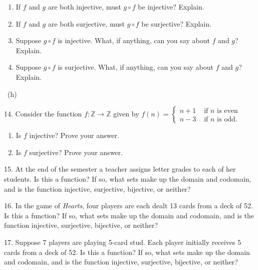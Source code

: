 \documentclass[10pt,]{book}
\theoremstyle{plain}
\theoremstyle{definition}
\theoremstyle{definition}
\theoremstyle{definition}
\numberwithin{equation}{chapter}
\def\Z{\mathbb Z}
\newcommand{\amp}{&}
\begin{document}
\begin{exerciselist}
\par
\hypertarget{p-2250}{}%
\leavevmode%
\begin{enumerate}[label=(\alph*)]
\item\hypertarget{li-464}{}\hypertarget{p-2251}{}%
If \(f\) and \(g\) are both injective, must \(g\circ f\) be injective?  Explain.%
\item\hypertarget{li-465}{}\hypertarget{p-2252}{}%
If \(f\) and \(g\) are both surjective, must \(g\circ f\) be surjective?  Explain.%
\item\hypertarget{li-466}{}\hypertarget{p-2253}{}%
Suppose \(g\circ f\) is injective.  What, if anything, can you say about \(f\) and \(g\)?  Explain.%
\item\hypertarget{li-467}{}\hypertarget{p-2254}{}%
Suppose \(g\circ f\) is surjective.  What, if anything, can you say about \(f\) and \(g\)?  Explain.%
\end{enumerate}
%
\par\smallskip
~{\tiny (h)}\item[14.]\hypertarget{exercise-95}{}\hypertarget{p-2261}{}%
Consider the function \(f:\Z \to \Z\) given by \(f(n) = \begin{cases}n+1 \amp  \text{ if }n\text{ is even} \\ n-3 \amp \text{ if }n\text{ is odd} . \end{cases}\) \leavevmode%
\begin{enumerate}[label=(\alph*)]
\item\hypertarget{li-472}{}\hypertarget{p-2262}{}%
Is \(f\) injective? Prove your answer.%
\item\hypertarget{li-473}{}\hypertarget{p-2263}{}%
Is \(f\) surjective? Prove your answer.%
\end{enumerate}
%
\par\smallskip
\item[15.]\hypertarget{exercise-96}{}\hypertarget{p-2269}{}%
At the end of the semester a teacher assigns letter grades to each of her students. Is this a function? If so, what sets make up the domain and codomain, and is the function injective, surjective, bijective, or neither?%
\par\smallskip
\item[16.]\hypertarget{exercise-97}{}\hypertarget{p-2271}{}%
In the game of \emph{Hearts}, four players are each dealt 13 cards from a deck of 52. Is this a function? If so, what sets make up the domain and codomain, and is the function injective, surjective, bijective, or neither?%
\par\smallskip
\item[17.]\hypertarget{exercise-98}{}\hypertarget{p-2273}{}%
Suppose 7 players are playing 5-card stud. Each player initially receives 5 cards from a deck of 52. Is this a function? If so, what sets make up the domain and codomain, and is the function injective, surjective, bijective, or neither?%
\par\smallskip
\end{exerciselist}
\typeout{************************************************}
\typeout{************************************************}
\end{document}
